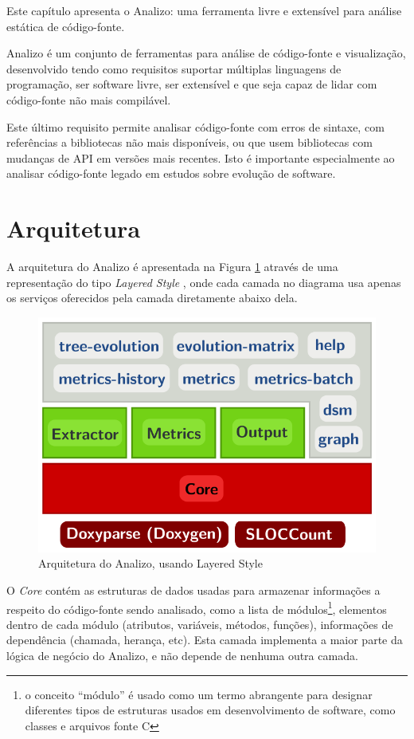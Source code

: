 {Este capítulo apresenta o Analizo: uma ferramenta livre e extensível para
análise estática de código-fonte.}
\label{analizo}

Analizo é um conjunto de ferramentas para análise de código-fonte e
visualização, desenvolvido tendo como requisitos suportar múltiplas linguagens
de programação, ser software livre, ser extensível e que seja capaz de lidar
com código-fonte não mais compilável.

Este último requisito permite analisar código-fonte com erros de sintaxe, com
referências a bibliotecas não mais disponíveis, ou que usem bibliotecas com
mudanças de API em versões mais recentes. Isto é importante especialmente ao
analisar código-fonte legado em estudos sobre evolução de software.

\section{Arquitetura}

A arquitetura do Analizo é apresentada na Figura \ref{arquitetura-analizo}
através de uma representação do tipo {\it Layered Style} \cite{Clements2002},
onde cada camada no diagrama usa apenas os serviços oferecidos pela camada
diretamente abaixo dela.

\begin{figure}[h]
\center
\includegraphics[scale=0.3]{imagens/analizo-architecture.png}
\caption{Arquitetura do Analizo, usando Layered Style \cite{Clements2002}}
\label{arquitetura-analizo}
\end{figure}

O {\it Core} contém as estruturas de dados usadas para armazenar informações a
respeito do código-fonte sendo analisado, como a lista de módulos\footnote{o
conceito ``módulo'' é usado como um termo abrangente para designar diferentes
tipos de estruturas usados em desenvolvimento de software, como classes e
arquivos fonte C}, elementos dentro de cada módulo (atributos, variáveis,
métodos, funções), informações de dependência (chamada, herança, etc). Esta
camada implementa a maior parte da lógica de negócio do Analizo, e não depende
de nenhuma outra camada.

